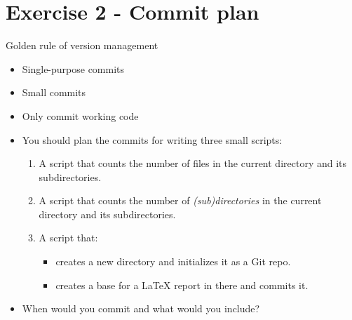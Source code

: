 
\section{Exercise 2 - Commit plan}

\begin{frame}
  \begin{block}{Golden rule of version management}
    \begin{itemize}
      \item Single-purpose commits
      \item Small commits
      \item Only commit working code
    \end{itemize}
  \end{block}
\end{frame}

\begin{frame}
  \begin{exercise}
    \begin{itemize}
      \item You should plan the commits for writing three small scripts:
        \begin{enumerate}
          \item A script that counts the number of files in the current 
            directory and its subdirectories.
          \item A script that counts the number of \emph{(sub)directories} in 
            the current directory and its subdirectories.
          \item A script that:
            \begin{itemize}
              \item creates a new directory and initializes it as a Git repo.
              \item creates a base for a LaTeX report in there and commits it.
            \end{itemize}
        \end{enumerate}
      \item When would you commit and what would you include?
    \end{itemize}
  \end{exercise}
\end{frame}


